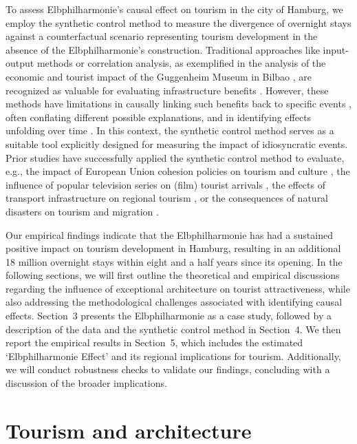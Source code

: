 \documentclass[a4paper, 12pt]{article}
\begin{document}
To assess Elbphilharmonie's causal effect on tourism in the city of Hamburg, we employ the synthetic control method \citep{abadie2021, abadie2003} to measure the divergence of overnight stays against a counterfactual scenario representing tourism development in the absence of the Elbphilharmonie's construction. Traditional approaches like input-output methods or correlation analysis, as exemplified in the analysis of the economic and tourist impact of the Guggenheim Museum in Bilbao \citep{plaza2000, plaza2006}, are recognized as valuable for evaluating infrastructure benefits \citep{scerri2019}. However, these methods have limitations in causally linking such benefits back to specific events \citep{doerr2020, tkalec2017}, often conflating different possible explanations, and in identifying effects unfolding over time \citep{dreher2020}. In this context, the synthetic control method serves as a suitable tool explicitly designed for measuring the impact of idiosyncratic events. Prior studies have successfully applied the synthetic control method to evaluate, e.g., the impact of European Union cohesion policies on tourism and culture \citep{brandano2023}, the influence of popular television series on (film) tourist arrivals \citep{tkalec2017}, the effects of transport infrastructure on regional tourism \citep{albalate2023, doerr2020}, or the consequences of natural disasters on tourism and migration \citep{antonaglia2024, kim2023}.

Our empirical findings indicate that the Elbphilharmonie has had a sustained positive impact on tourism development in Hamburg, resulting in an additional 18 million overnight stays within eight and a half years since its opening. In the following sections, we will first outline the theoretical and empirical discussions regarding the influence of exceptional architecture on tourist attractiveness, while also addressing the methodological challenges associated with identifying causal effects. Section~3 presents the Elbphilharmonie as a case study, followed by a description of the data and the synthetic control method in Section~4. We then report the empirical results in Section~5, which includes the estimated `Elbphilharmonie Effect' and its regional implications for tourism. Additionally, we will conduct robustness checks to validate our findings, concluding with a discussion of the broader implications.


\section{Tourism and architecture}
\end{document}
